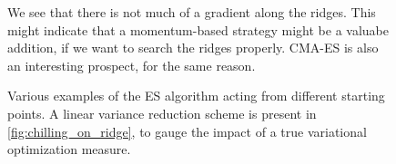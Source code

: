 \begin{figure}[ht]
    \hfill
    \caption{We see that there is not much of a gradient along the ridges. This might indicate that a momentum-based strategy might be a valuabe addition, if we want to search the ridges properly. CMA-ES is also an interesting prospect, for the same reason.}
\end{figure}
\begin{figure}[ht]
    \hfill
    \caption{Various examples of the ES algorithm acting from different starting points. A linear variance reduction scheme is present in \cref{fig:chilling_on_ridge}, to gauge the impact of a true variational optimization measure.}
    \label{fig:ES-examples} 
\end{figure} 

